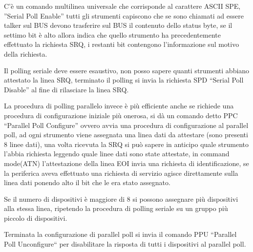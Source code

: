 C'è un comando multilinea universale che corrisponde al carattere ASCII SPE,
''Serial Poll Enable'' tutti gli strumenti capiscono che se sono chiamati ad
essere talker sul BUS devono trasferire sul BUS il contenuto dello status byte,
se il settimo bit è alto allora indica che quello strumento ha precedentemente
effettuato la richiesta SRQ, i restanti bit contengono l'informazione sul
motivo della richiesta.

Il polling seriale deve essere esaustivo, non posso sapere quanti strumenti
abbiano attestato la linea SRQ, terminato il polling si invia la richiesta SPD
``Serial Poll Disable'' al fine di rilasciare la linea SRQ.

La procedura di polling parallelo invece è più efficiente anche se richiede una
procedura di configurazione iniziale più onerosa, si dà un comando detto PPC
``Parallel Poll Configure'' ovvero avvia una procedura di configurazione al
parallel poll, ad ogni strumento viene assegnata una linea dati da
attestare (sono presenti 8 linee dati), una volta ricevuta la SRQ si può sapere
in anticipo quale strumento l'abbia richiesta leggendo quale linee dati sono
state attestate, in command mode(ATN) l'attestazione della linea EOI invia una
richiesta di identificazione, se la periferica aveva effettuato una richiesta
di servizio agisce direttamente sulla linea dati ponendo alto il bit che le era
stato assegnato.

Se il numero di dispositivi è maggiore di 8 si possono assegnare più
dispositivi alla stessa linea, ripetendo la procedura di polling seriale su un
gruppo più piccolo di dispositivi.

Terminata la configurazione di parallel poll si invia il comando PPU ``Parallel
Poll Unconfigure`` per disabilitare la risposta di tutti i dispositivi al
parallel poll.

